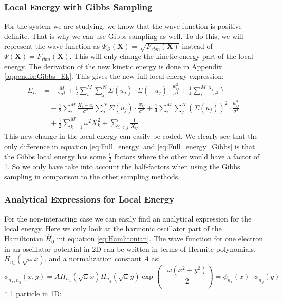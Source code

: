 \documentclass[12pt,a4paper,english]{article}
\begin{document}
\subsubsection{Local Energy with Gibbs Sampling}
\label{subsubsect:Gibbs_EL}
For the system we are studying, we know that the wave function is positive definite. That is why we can use Gibbs sampling as well. To do this, we will represent the wave function as $\Psi_G(\textbf{X})=\sqrt{F_{rbm}(\textbf{X})}$ instead of $\Psi(\textbf{X})=F_{rbm}(\textbf{X})$. This will only change the kinetic energy part of the local energy. The derivation of the new kinetic energy is done in Appendix \ref{appendix:Gibbs_Ek}. This gives the new full local energy expression:
\begin{align}
\label{eq:Full_energy_Gibbs}
E_L&=-\frac{M}{2\sigma^2} +\frac{1}{2}\sum_{i}^{M}\sum_{j}^{N}\Sigma(u_j)\cdot\Sigma(-u_j)\cdot\frac{w_{ij}^2}{\sigma^4} +\frac{1}{4}\sum_{i}^{M}\frac{X_i-a_i}{\sigma^2}\nonumber\\ 
&\quad -\frac{1}{2}\sum_{i}^{M}\frac{X_i-a_i}{\sigma^2}\sum_{j}^{N}\Sigma(u_j)\cdot\frac{w_{ij}}{\sigma^2} 
+\frac{1}{4}\sum_{i}^{M}\sum_{j}^{N}(\Sigma(u_j))^2\cdot\frac{w_{ij}^2}{\sigma^4}\nonumber\\
&\quad +\frac{1}{2}\sum_{k=1}^{M}\omega^2X_k^2 + \sum_{i<j}\frac{1}{X_{ij}}
\end{align}
This new change in the local energy can easily be coded. We clearly see that the only difference in equation \ref{eq:Full_energy} and \ref{eq:Full_energy_Gibbs} is that the Gibbs local energy has some $\frac{1}{2}$ factors where the other would have a factor of 1. So we only have take into account the half-factors when using the Gibbs sampling in comparison to the other sampling methods.

\subsubsection{Analytical Expressions for Local Energy}
\label{subsubsect:Analytical E_L}
For the non-interacting case we can easily find an analytical expression for the local energy. Here we only look at the harmonic oscillator part of the Hamiltonian $\hat{H}_0$ int equation \ref{eq:Hamlitonian}. The wave function for one electron in an oscillator potential in 2D can be written in terms of Hermite polynomials, $H_{n_x}(\sqrt{\omega}x)$, and a normalization constant $A$ as:
\begin{equation}
\label{eq:simple_wf}
\phi_{n_x,n_y}(x,y)=AH_{n_x}(\sqrt{\omega}x)H_{n_y}(\sqrt{\omega}y)\exp\left(-\frac{\omega(x^2+y^2)}{2}\right)=\phi_{n_x}(x)\cdot\phi_{n_y}(y)
\end{equation}
\underline{* 1 particle in 1D:}
\end{document}
